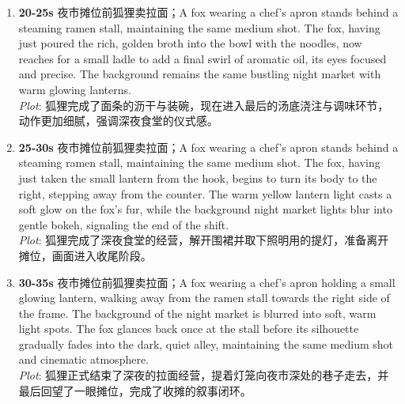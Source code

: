 \documentclass[11pt,a4paper]{article}
\begin{document}
\begin{enumerate}
\item \textbf{20-25s} 夜市摊位前狐狸卖拉面；A fox wearing a chef's apron stands behind a steaming ramen stall, maintaining the same medium shot. The fox, having just poured the rich, golden broth into the bowl with the noodles, now reaches for a small ladle to add a final swirl of aromatic oil, its eyes focused and precise. The background remains the same bustling night market with warm glowing lanterns.\\\newline \textit{Plot}: 狐狸完成了面条的沥干与装碗，现在进入最后的汤底浇注与调味环节，动作更加细腻，强调深夜食堂的仪式感。
\item \textbf{25-30s} 夜市摊位前狐狸卖拉面；A fox wearing a chef's apron stands behind a steaming ramen stall, maintaining the same medium shot. The fox, having just taken the small lantern from the hook, begins to turn its body to the right, stepping away from the counter. The warm yellow lantern light casts a soft glow on the fox's fur, while the background night market lights blur into gentle bokeh, signaling the end of the shift.\\\newline \textit{Plot}: 狐狸完成了深夜食堂的经营，解开围裙并取下照明用的提灯，准备离开摊位，画面进入收尾阶段。
\item \textbf{30-35s} 夜市摊位前狐狸卖拉面；A fox wearing a chef's apron holding a small glowing lantern, walking away from the ramen stall towards the right side of the frame. The background of the night market is blurred into soft, warm light spots. The fox glances back once at the stall before its silhouette gradually fades into the dark, quiet alley, maintaining the same medium shot and cinematic atmosphere.\\\newline \textit{Plot}: 狐狸正式结束了深夜的拉面经营，提着灯笼向夜市深处的巷子走去，并最后回望了一眼摊位，完成了收摊的叙事闭环。
\end{enumerate}
\end{document}
